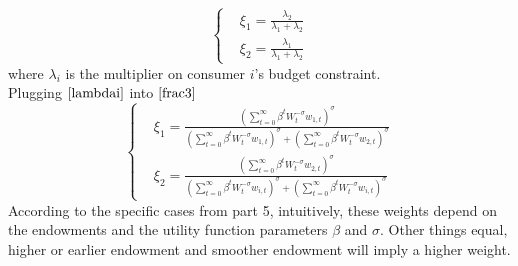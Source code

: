 \documentclass{article}
\begin{document}
\begin{enumerate}
\begin{equation}
            \left\{\begin{aligned}
                &\xi_1=\frac{\lambda_2}{\lambda_1+\lambda_2}\\
                &\xi_2=\frac{\lambda_1}{\lambda_1+\lambda_2}
            \end{aligned}\right.\label{frac3}
        \end{equation}
        where $\lambda_i$ is the multiplier on consumer $i$'s budget constraint.\\
        Plugging \(\eqref{lambdai}\) into \(\eqref{frac3}\)
        \begin{equation*}
            \left\{\begin{aligned}
                &\xi_1=\frac{(\sum_{t=0}^\infty\beta^t W_t^{-\sigma}w_{1,t})^{\sigma}}{(\sum_{t=0}^\infty\beta^t W_t^{-\sigma}w_{1,t})^{\sigma}+(\sum_{t=0}^\infty\beta^t W_t^{-\sigma}w_{2,t})^{\sigma}}\\
                &\xi_2=\frac{(\sum_{t=0}^\infty\beta^t W_t^{-\sigma}w_{2,t})^{\sigma}}{(\sum_{t=0}^\infty\beta^t W_t^{-\sigma}w_{i,t})^{\sigma}+(\sum_{t=0}^\infty\beta^t W_t^{-\sigma}w_{i,t})^{\sigma}}
            \end{aligned}\right.
        \end{equation*}
        According to the specific cases from part 5, intuitively, these weights depend on the endowments and the utility function parameters $\beta$ and $\sigma$.
        Other things equal, higher or earlier endowment and smoother endowment will imply a higher weight.
    \end{enumerate}
\end{document}
